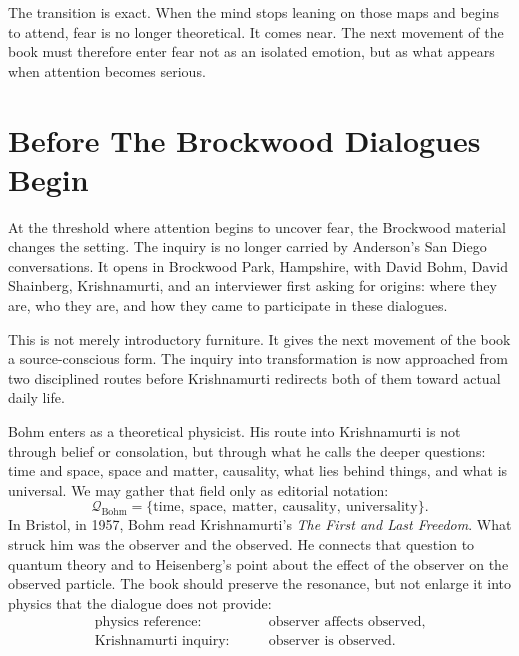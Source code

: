 \documentclass[11pt,oneside]{book}
\begin{document}
The transition is exact. When the mind stops leaning on those maps and begins to attend, fear is no longer theoretical. It comes near. The next movement of the book must therefore enter fear not as an isolated emotion, but as what appears when attention becomes serious.


\section{Before The Brockwood Dialogues Begin}

At the threshold where attention begins to uncover fear, the Brockwood material changes the setting. The inquiry is no longer carried by Anderson's San Diego conversations. It opens in Brockwood Park, Hampshire, with David Bohm, David Shainberg, Krishnamurti, and an interviewer first asking for origins: where they are, who they are, and how they came to participate in these dialogues.

This is not merely introductory furniture. It gives the next movement of the book a source-conscious form. The inquiry into transformation is now approached from two disciplined routes before Krishnamurti redirects both of them toward actual daily life.

Bohm enters as a theoretical physicist. His route into Krishnamurti is not through belief or consolation, but through what he calls the deeper questions: time and space, space and matter, causality, what lies behind things, and what is universal. We may gather that field only as editorial notation:
\begin{equation}
\mathcal{Q}_{\mathrm{Bohm}}
=
\{\text{time},\ \text{space},\ \text{matter},\ \text{causality},\ \text{universality}\}.
\end{equation}
In Bristol, in 1957, Bohm read Krishnamurti's \emph{The First and Last Freedom}. What struck him was the observer and the observed. He connects that question to quantum theory and to Heisenberg's point about the effect of the observer on the observed particle. The book should preserve the resonance, but not enlarge it into physics that the dialogue does not provide:
\begin{align}
\text{physics reference:}\qquad
&\text{observer affects observed},\\
\text{Krishnamurti inquiry:}\qquad
&\text{observer is observed}.
\end{align}
\end{document}
